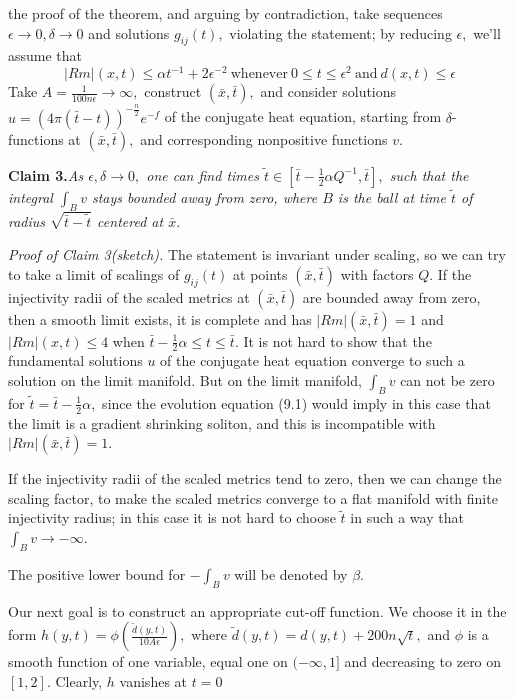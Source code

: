 \documentclass[12pt]{article}
\newcommand{\e}{\epsilon}
\newcommand{\de}{\delta}
\newcommand{\al}{\alpha}
\newcommand{\be}{\beta}
\newcommand{\bx}{\bar{x}}
\newcommand{\bt}{\bar{t}}
\theoremstyle{plain}
{\swapnumbers
\newtheorem{thm}{Theorem}[section]
\newtheorem{cor}[thm]{Corollary}
\newtheorem{lem}[thm]{Lemma}
\newtheorem{prop}[thm]{Proposition}
}
\theoremstyle{definition}
{\swapnumbers
\newtheorem{defn}[thm]{Definition}
\newtheorem{nota}[thm]{Notation}
\newtheorem{parag}[thm]{}
\newtheorem*{parstr}{\addtocounter{thm}{1}\thesection.\arabic{thm}*}
\newtheorem*{intropar}{\addtocounter{thm}{1}\arabic{thm}}
}
\theoremstyle{remark} {\swapnumbers
\newtheorem{rem}[thm]{Remark}
\newtheorem{exam}[thm]{Example}
\newtheorem{lemma}[thm]{Lemma}
\newtheorem{claim}[thm]{Claim}
}
\numberwithin{equation}{section}
\begin{document}
 the proof of the theorem, and arguing by contradiction, take
 sequences $\e\to 0,\de\to 0$ and solutions $g_{ij}(t),$ violating
 the statement; by reducing $\e,$ we'll assume that
 \begin{equation}
 |Rm|(x,t)\le  \alpha t^{-1}+2\e^{-2}\  \mbox{whenever}\  0\le t\le \e^2\
 \mbox{and}\
 d(x,t)\le \e \end{equation} Take $A=\frac{1}{100n\e}\to\infty ,$ construct
 $(\bx,\bt),$ and consider solutions
 $u=(4\pi(\bt-t))^{-\frac{n}{2}}e^{-f}$ of the conjugate heat
 equation, starting from $\de$-functions at $(\bx,\bt),$ and
 corresponding nonpositive functions $v.$ \par {\bf Claim 3.}{\it  As $\e
 ,\de\to 0,$ one can find times $\tilde{t}\in[\bt -\frac{1}{2}\al
 Q^{-1},\bt],$ such that the integral $\int_B{v}$ stays bounded
 away from zero, where $B$ is the ball at time $\tilde{t}$ of
 radius $\sqrt{\bt-\tilde{t}}$ centered at $\bx.$ }\par {\it Proof of Claim
 3(sketch).}
 The statement is invariant under scaling, so we can try to take a
  limit of scalings of $g_{ij}(t)$ at points $(\bx,\bt)$ with factors
 $Q.$ If the injectivity radii of the scaled metrics at $(\bx,\bt)$ are bounded
 away from zero, then a smooth limit exists, it is complete and
 has $|Rm|(\bx,\bt)=1$ and $|Rm|(x,t)\le 4$ when $\bt
 -\frac{1}{2}\al \le t\le \bt.$ It is not hard to show that the
 fundamental
 solutions $u$ of the conjugate heat equation converge to such a
 solution on the limit manifold. But on the limit manifold,
 $\int_B{v}$ can not be zero for $\tilde{t}=\bt -\frac{1}{2}\al ,$
 since the evolution equation (9.1) would imply in this case that
 the limit is a gradient shrinking soliton, and this is
 incompatible with $|Rm|(\bx,\bt)=1.$ \par If the injectivity
 radii of the scaled metrics tend to zero, then we can change
 the scaling factor, to make the scaled metrics converge to a flat
 manifold with finite injectivity radius; in this case it is not
 hard to choose $\tilde{t}$ in such a way that $\int_B{v}\to
 -\infty.$
 \par The positive lower bound for $-\int_B{v}$ will be denoted by
 $\be.$ \par Our next goal is to construct an appropriate cut-off
 function. We choose it in the form
 $h(y,t)=\phi(\frac{\tilde{d}(y,t)}{10A\e}),$ where
 $\tilde{d}(y,t)=d(y,t)+200n\sqrt{t},$ and $\phi$ is a smooth
 function of one variable, equal one on $(-\infty,1]$ and
 decreasing to zero on $[1,2].$ Clearly, $h$ vanishes at $t=0$
\end{document}
